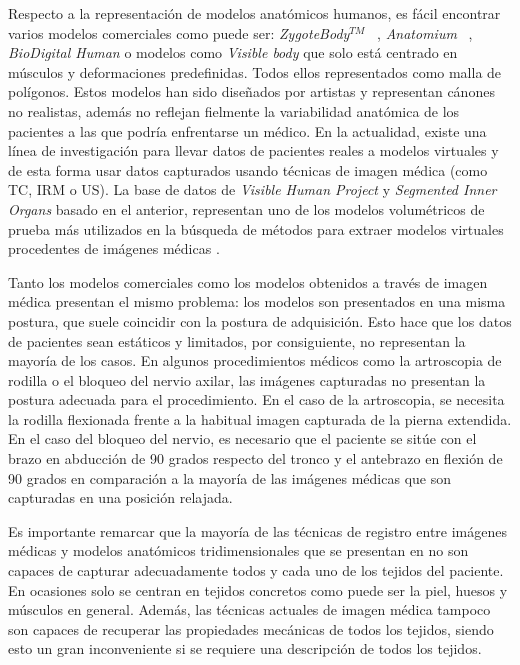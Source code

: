 Respecto a la representación de modelos anatómicos humanos, es fácil encontrar  varios modelos comerciales como puede ser: \emph{ZygoteBody}$^{TM}$ ~\cite{kelc2012zygote}, \emph{Anatomium} ~\cite{Anatomium},   \emph{BioDigital Human} \cite{qualter2012biodigital} o modelos como \emph{Visible body}\cite{visible2012visible} que solo está centrado en músculos y deformaciones predefinidas. Todos ellos representados como malla de polígonos. Estos modelos han sido  diseñados por artistas y representan cánones no realistas, además no reflejan fielmente la variabilidad anatómica de los pacientes a las que podría enfrentarse un médico. En la actualidad, existe una línea de investigación para llevar datos de pacientes reales a modelos virtuales y de esta forma usar datos capturados usando técnicas de imagen médica (como \ac{TC}, \ac{IRM} o \ac{US}). La base de datos de  \emph{Visible Human Project}\cite{ackerman1998visible} y  \emph{Segmented Inner Organs}\cite{VoxelMan} basado en el anterior, representan uno de los modelos volumétricos de prueba más utilizados en la búsqueda de métodos para extraer modelos virtuales procedentes de imágenes médicas \cite{ferrante2017slice}.

Tanto los modelos comerciales como los modelos obtenidos a través de imagen médica presentan el mismo problema: los modelos son presentados en una misma postura, que suele coincidir con la postura de adquisición. Esto hace que los datos de pacientes sean estáticos y limitados, por consiguiente, no representan la mayoría de los casos. En algunos procedimientos médicos como la artroscopia de rodilla o el bloqueo del nervio axilar, las imágenes capturadas no presentan la postura adecuada para el procedimiento. En el caso de la artroscopia, se necesita la rodilla flexionada frente a la habitual imagen capturada de la pierna extendida. En el caso del bloqueo del nervio, es necesario que el paciente se sitúe con el brazo en abducción de 90 grados respecto del tronco y el antebrazo en flexión de 90 grados en comparación a la mayoría de las imágenes médicas que son capturadas en una posición relajada. 

Es importante remarcar que la mayoría de las técnicas de registro entre imágenes médicas y modelos anatómicos tridimensionales que se presentan en \cite{ferrante2017slice} no son capaces de capturar adecuadamente todos y cada uno de los tejidos del paciente. En ocasiones solo se centran en tejidos concretos como puede ser la piel, huesos y músculos en general. Además, las técnicas actuales de imagen médica tampoco son capaces de recuperar las propiedades mecánicas de todos los tejidos, siendo esto un gran inconveniente si se requiere una descripción de todos los tejidos.

